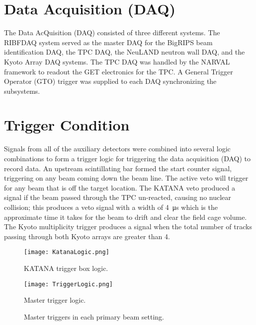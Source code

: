 \section{Data Acquisition (DAQ) }
The Data AcQuisition (DAQ) consisted of three different systems. The RIBFDAQ system served as the master DAQ for the BigRIPS beam identification DAQ, the TPC DAQ, the NeuLAND neutron wall DAQ, and the Kyoto Array DAQ systems. The TPC DAQ was handled by the NARVAL framework to readout the GET electronics for the \spirit TPC. A General Trigger Operator (GTO) trigger was supplied to each DAQ synchronizing the subsystems. 

\section{Trigger Condition}
Signals from all of the auxiliary detectors were combined into several logic combinations to form a trigger logic for triggering the data acquisition  (DAQ) to record data. An upstream scintillating bar formed the start counter signal, triggering on any beam coming down the beam line. The active veto will trigger for any beam that is off the target location. The KATANA veto produced a signal if the beam passed through the TPC un-reacted, causing no nuclear collision; this produces a veto signal with a width of \SI{4}{\micro\second} which is the approximate time it takes for the beam to drift and clear the field cage volume. The Kyoto multiplicity trigger produces a signal when the total number of tracks passing through both Kyoto arrays are greater than 4. 


\begin{figure}[!htb]
\texttt{[image: KatanaLogic.png]}
\caption{KATANA trigger box logic.}
\label{fig:katanaLogic}
\end{figure}

\begin{figure}[!htb]
\texttt{[image: TriggerLogic.png]} 
\caption{Master trigger logic.}
\label{fig:trigLogic} 
\end{figure}

\begin{figure}[!htb]%
    \centering
    \qquad
	\caption{Master triggers in each primary beam setting.}    
	\label{fig:datatrigger}
\end{figure}

